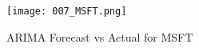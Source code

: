 \documentclass{article}
\begin{document}
\begin{figure}[h]
\centering
\texttt{[image: 007\_MSFT.png]}
\caption{ARIMA Forecast vs Actual for MSFT}
\label{fig:MSFT_forecast}
\end{figure}
\end{document}
